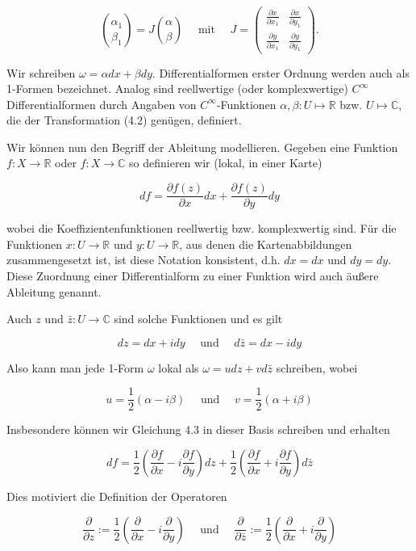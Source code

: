 \documentclass[10pt, letterpaper]{article}
\begin{document}
$$
\binom{\alpha_{1}}{\beta_{1}}=J\binom{\alpha}{\beta} \quad \text { mit } \quad J=\left(\begin{array}{cc}
\frac{\partial x}{\partial x_{1}} & \frac{\partial x}{\partial y_{1}} \\
\frac{\partial y}{\partial x_{1}} & \frac{\partial y}{\partial y_{1}}
\end{array}\right) .
$$

Wir schreiben $\omega=\alpha d x+\beta d y$. Differentialformen erster Ordnung werden auch als 1-Formen bezeichnet. Analog sind reellwertige (oder komplexwertige) $C^{\infty}$ Differentialformen durch Angaben von $C^{\infty}$-Funktionen $\alpha, \beta: U \longmapsto \mathbb{R}$ bzw. $U \longmapsto \mathbb{C}$, die der Transformation (4.2) genügen, definiert.

Wir können nun den Begriff der Ableitung modellieren. Gegeben eine Funktion $f: X \rightarrow \mathbb{R}$ oder $f: X \rightarrow \mathbb{C}$ so definieren wir (lokal, in einer Karte)

$$
d f=\frac{\partial f(z)}{\partial x} d x+\frac{\partial f(z)}{\partial y} d y
$$

wobei die Koeffizientenfunktionen reellwertig bzw. komplexwertig sind. Für die Funktionen $x: U \rightarrow \mathbb{R}$ und $y: U \rightarrow \mathbb{R}$, aus denen die Kartenabbildungen zusammengesetzt ist, ist diese Notation konsistent, d.h. $d x=d x$ und $d y=d y$. Diese Zuordnung einer Differentialform zu einer Funktion wird auch äußere Ableitung genannt.

Auch $z$ und $\bar{z}: U \longrightarrow \mathbb{C}$ sind solche Funktionen und es gilt

$$
d z=d x+i d y \quad \text { und } \quad d \bar{z}=d x-i d y
$$

Also kann man jede 1-Form $\omega$ lokal als $\omega=u d z+v d \bar{z}$ schreiben, wobei

$$
u=\frac{1}{2}(\alpha-i \beta) \quad \text { und } \quad v=\frac{1}{2}(\alpha+i \beta)
$$

Insbesondere können wir Gleichung 4.3 in dieser Basis schreiben und erhalten

$$
d f=\frac{1}{2}\left(\frac{\partial f}{\partial x}-i \frac{\partial f}{\partial y}\right) d z+\frac{1}{2}\left(\frac{\partial f}{\partial x}+i \frac{\partial f}{\partial y}\right) d \bar{z}
$$

Dies motiviert die Definition der Operatoren

$$
\frac{\partial}{\partial z}:=\frac{1}{2}\left(\frac{\partial}{\partial x}-i \frac{\partial}{\partial y}\right) \quad \text { und } \quad \frac{\partial}{\partial \bar{z}}:=\frac{1}{2}\left(\frac{\partial}{\partial x}+i \frac{\partial}{\partial y}\right)
$$
\end{document}
